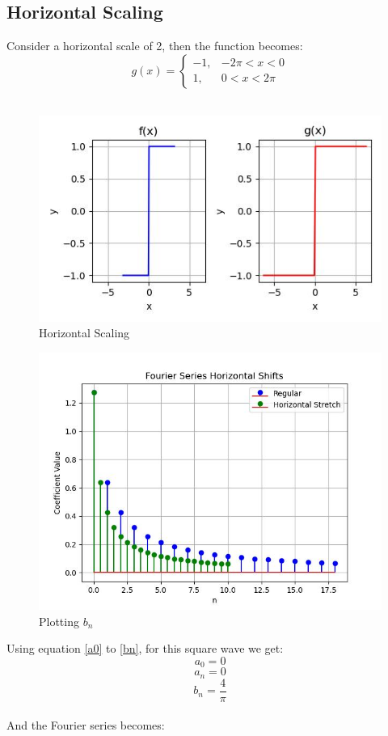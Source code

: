 \documentclass{article}
\begin{document}
\subsection{Horizontal Scaling}
Consider a horizontal scale of 2, then the function becomes:
\begin{equation}
g(x) = 
\begin{cases} 
-1, & -2\pi < x < 0 \\
1, & 0 < x < 2\pi
\end{cases}
\end{equation}\\
\begin{figure}
    \centering
    \includegraphics[width=\textwidth]{horizontal_scaling.jpg}
    \caption{Horizontal Scaling}
    \label{fig:enter-label}
\end{figure}
\begin{figure}
    \centering
    \includegraphics[width=\textwidth]{horizontal_stem_stretch.jpg}
    \caption{Plotting $b_n$}
    \label{fig:enter-label}
\end{figure}
Using equation \ref{a0} to \ref{bn}, for this square wave we get:
    \begin{equation}
    a_0 = 0
    \end{equation}
    \begin{equation}
    a_n = 0
    \end{equation}
    \begin{equation}
    b_n = \frac{4}{\pi}
    \end{equation}\\
And the Fourier series becomes:
\end{document}
